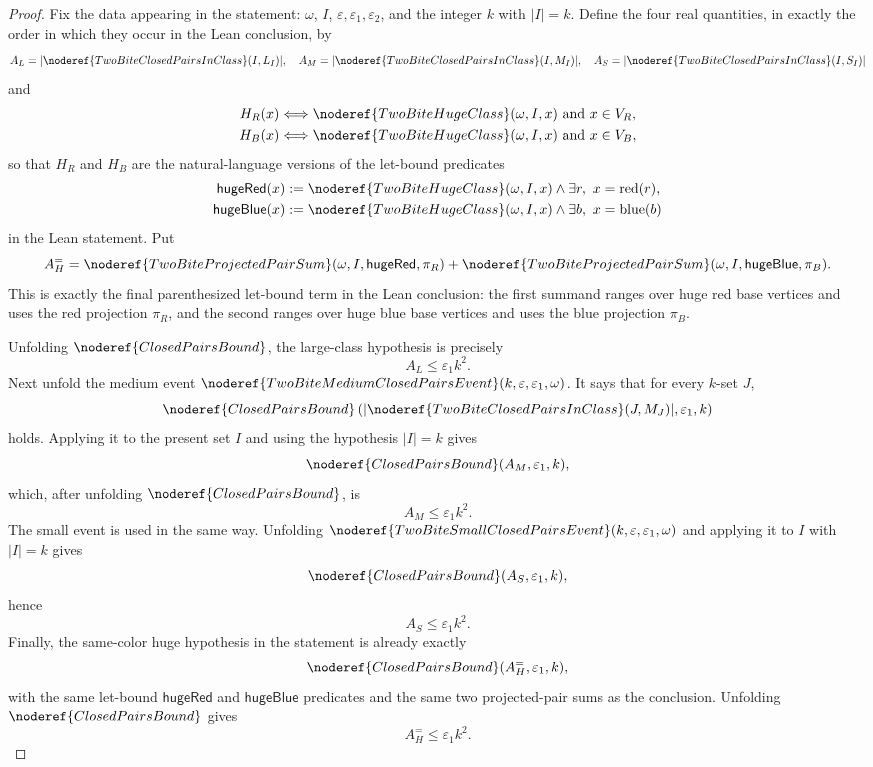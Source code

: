 \begin{proof}
Fix the data appearing in the statement:
\(\omega\), \(I\), \(\varepsilon,\varepsilon_1,\varepsilon_2\), and the
integer \(k\) with \(|I|=k\).  Define the four real quantities, in exactly the
order in which they occur in the Lean conclusion, by
\[
A_L=|\noderef{TwoBiteClosedPairsInClass}(I,L_I)|,\quad
A_M=|\noderef{TwoBiteClosedPairsInClass}(I,M_I)|,\quad
A_S=|\noderef{TwoBiteClosedPairsInClass}(I,S_I)|
\]
and
\[
\begin{aligned}
H_R(x)&\Longleftrightarrow
  \noderef{TwoBiteHugeClass}(\omega,I,x)\text{ and }x\in V_R,\\
H_B(x)&\Longleftrightarrow
  \noderef{TwoBiteHugeClass}(\omega,I,x)\text{ and }x\in V_B,
\end{aligned}
\]
so that \(H_R\) and \(H_B\) are the natural-language versions of the
let-bound predicates
\[
\begin{aligned}
\mathsf{hugeRed}(x)&:=
  \noderef{TwoBiteHugeClass}(\omega,I,x)\wedge
  \exists r,\ x=\operatorname{red}(r),\\
\mathsf{hugeBlue}(x)&:=
  \noderef{TwoBiteHugeClass}(\omega,I,x)\wedge
  \exists b,\ x=\operatorname{blue}(b)
\end{aligned}
\]
in the Lean statement.  Put
\[
A_H^{=}
=
\noderef{TwoBiteProjectedPairSum}(\omega,I,\mathsf{hugeRed},\pi_R)
+
\noderef{TwoBiteProjectedPairSum}(\omega,I,\mathsf{hugeBlue},\pi_B).
\]
This is exactly the final parenthesized let-bound term in the Lean
conclusion: the first summand ranges over huge red base vertices and uses
the red projection \(\pi_R\), and the second ranges over huge blue base
vertices and uses the blue projection \(\pi_B\).

Unfolding \(\noderef{ClosedPairsBound}\), the large-class hypothesis is
precisely
\[
A_L\le \varepsilon_1 k^2. \tag{1}
\]
Next unfold the medium event
\(\noderef{TwoBiteMediumClosedPairsEvent}(k,\varepsilon,\varepsilon_1,\omega)\).
It says that for every \(k\)-set \(J\),
\[
\noderef{ClosedPairsBound}
\left(|\noderef{TwoBiteClosedPairsInClass}(J,M_J)|,\varepsilon_1,k\right)
\]
holds.  Applying it to the present set \(I\) and using the hypothesis
\(|I|=k\) gives
\[
\noderef{ClosedPairsBound}(A_M,\varepsilon_1,k),
\]
which, after unfolding \(\noderef{ClosedPairsBound}\), is
\[
A_M\le \varepsilon_1 k^2. \tag{2}
\]
The small event is used in the same way.  Unfolding
\(\noderef{TwoBiteSmallClosedPairsEvent}(k,\varepsilon,\varepsilon_1,\omega)\)
and applying it to \(I\) with \(|I|=k\) gives
\[
\noderef{ClosedPairsBound}(A_S,\varepsilon_1,k),
\]
hence
\[
A_S\le \varepsilon_1 k^2. \tag{3}
\]
Finally, the same-color huge hypothesis in the statement is already exactly
\[
\noderef{ClosedPairsBound}(A_H^{=},\varepsilon_1,k),
\]
with the same let-bound \(\mathsf{hugeRed}\) and \(\mathsf{hugeBlue}\)
predicates and the same two projected-pair sums as the conclusion.  Unfolding
\(\noderef{ClosedPairsBound}\) gives
\[
A_H^{=}\le \varepsilon_1 k^2. \tag{4}
\]


\end{proof}
